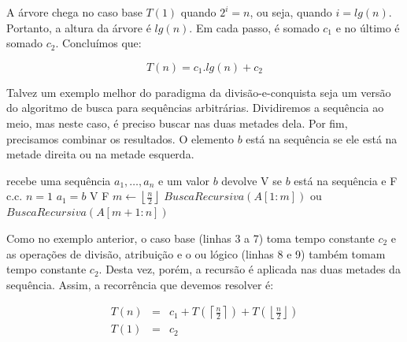 \begin{center}
\end{center}

A árvore chega no caso base $T(1)$ quando $2^i = n$, ou seja, quando $i = lg(n)$.
Portanto, a altura da árvore é $lg(n)$.
Em cada passo, é somado $c_1$ e no último é somado $c_2$.
Concluímos que:

\begin{displaymath}
  T(n) = c_1.lg(n) + c_2
\end{displaymath}


Talvez um exemplo melhor do paradigma da divisão-e-conquista seja um versão do algoritmo de busca para sequências arbitrárias.
Dividiremos a sequência ao meio, mas neste caso, é preciso buscar nas duas metades dela.
Por fim, precisamos combinar os resultados.
O elemento $b$ está na sequência se ele está na metade direita ou na metade esquerda.

\begin{codebox}
  \li \Comment recebe uma sequência $a_1, \dots, a_n$ e um valor $b$
  \li \Comment devolve V se $b$ está na sequência e F c.c.
  \li \If $n = 1$
  \li \Then \If $a_1 = b$
  \li \Then \Return V
  \End
  \li \Else
  \li \Return F
  \End 
  \li $m \gets \left \lfloor{\frac{n}{2}}\right\rfloor$
  \li \Return $BuscaRecursiva(A[1:m])$ ou $BuscaRecursiva(A[m+1:n])$
  \End
\end{codebox}

Como no exemplo anterior, o caso base (linhas 3 a 7) toma tempo constante $c_2$ e as operações de divisão, atribuição e o ou lógico (linhas 8 e 9) também tomam tempo constante $c_2$.
Desta vez, porém, a recursão é aplicada nas duas metades da sequência.
Assim, a recorrência que devemos resolver é:

\begin{eqnarray*}
  T(n) & = & c_1 + T(\left \lceil{\frac{n}{2}}\right \rceil) + T(\left \lfloor{\frac{n}{2}}\right \rfloor)\\
  T(1) & = & c_2
\end{eqnarray*}

